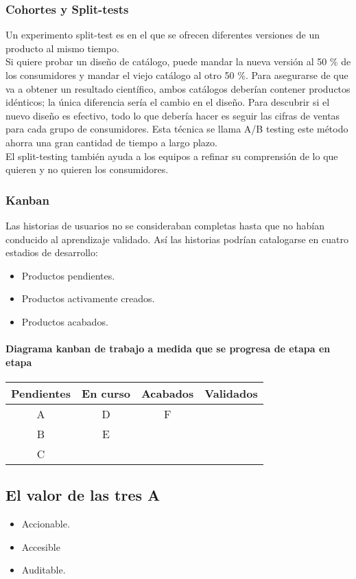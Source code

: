 \documentclass[10pt]{article}
\begin{document}
\begin{multicols}{2}
\subsubsection*{Cohortes y Split-tests}
{\color{blue}Un experimento split-test es en el que se ofrecen diferentes versiones de un producto al mismo tiempo. \\
 Si quiere probar un diseño de catálogo, puede mandar la nueva versión al 50 \% de los consumidores y mandar el viejo catálogo al otro 50 \%. Para asegurarse de que va a obtener un resultado científico, ambos catálogos deberían contener productos idénticos; la única diferencia sería el cambio en el diseño. Para descubrir si el nuevo diseño es efectivo, todo lo que debería hacer es seguir las cifras de ventas para cada grupo de consumidores. Esta técnica se llama A/B testing} este método ahorra una gran cantidad de tiempo a largo plazo.\\
El split-testing también ayuda a los equipos a refinar su comprensión de lo que quieren y no quieren los consumidores.
\subsubsection*{Kanban}
Las historias de usuarios no se consideraban completas hasta que no habían conducido al aprendizaje validado. Así las historias podrían catalogarse en cuatro estadios de desarrollo:
\begin{itemize}
\item Productos pendientes.
\item Productos activamente creados.
\item Productos acabados.
\end{itemize}
\paragraph*{Diagrama kanban de trabajo a medida que se progresa de etapa en etapa}

\begin{center}
\begin{tabular}{c c c c}
\textbf{Pendientes}&\textbf{En curso}&\textbf{Acabados}&\textbf{Validados}\\
\hline
A&D&F&\\
B&E&&\\
C&&&\\
\end{tabular}
\end{center}
\subsection*{El valor de las tres A}
\begin{itemize}
\item Accionable.
\item Accesible
\item Auditable.
\end{itemize}

\end{multicols}
\end{document}
